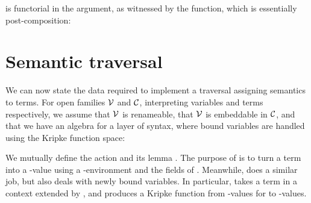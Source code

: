  is functorial in the \AgdaBound{$\C$} argument,
as witnessed by the  function, which is essentially
post-composition:




\section{Semantic traversal}\label{sec:traversal}

We can now state the data required to implement a traversal assigning
semantics to terms. For open families $\V$ and $\C$, interpreting
variables and terms respectively, we assume that $\V$ is renameable,
that $\V$ is embeddable in $\C$, and that we have an algebra for a
layer of syntax, where bound variables are handled using the Kripke
function space:




We mutually define the action  and its lemma
.
The purpose of  is to turn a term into a
\AgdaBound{$\C$}-value using a \AgdaBound{$\V$}-environment and the fields of
.
Meanwhile,  does a similar job, but also deals with
newly bound variables.
In particular,  takes a term in a context extended by
\AgdaBound{$\Theta$}, and produces a Kripke function from
\AgdaBound{$\V$}-values for \AgdaBound{$\Theta$} to \AgdaBound{$\C$}-values.

